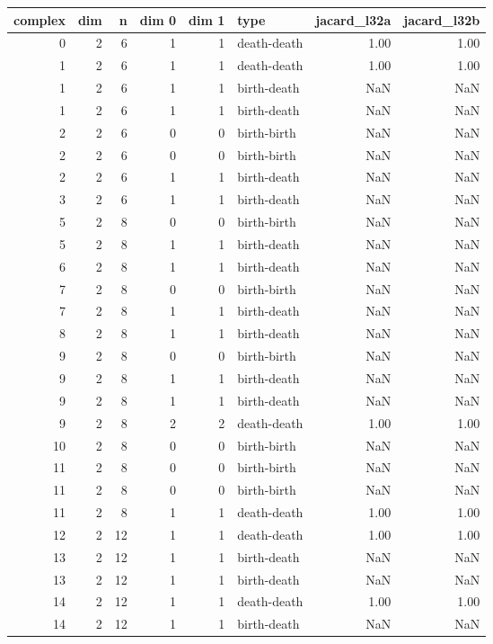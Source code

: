 \documentclass{article}
\begin{document}
\begin{center}
\begin{tabular}{rrrrrlrr}
\toprule
complex & dim & n & dim 0 & dim 1 & type & jacard\_l32a & jacard\_l32b \\
\midrule
0 & 2 & 6 & 1 & 1 & death-death & 1.00 & 1.00 \\
1 & 2 & 6 & 1 & 1 & death-death & 1.00 & 1.00 \\
1 & 2 & 6 & 1 & 1 & birth-death & NaN & NaN \\
1 & 2 & 6 & 1 & 1 & birth-death & NaN & NaN \\
2 & 2 & 6 & 0 & 0 & birth-birth & NaN & NaN \\
2 & 2 & 6 & 0 & 0 & birth-birth & NaN & NaN \\
2 & 2 & 6 & 1 & 1 & birth-death & NaN & NaN \\
3 & 2 & 6 & 1 & 1 & birth-death & NaN & NaN \\
5 & 2 & 8 & 0 & 0 & birth-birth & NaN & NaN \\
5 & 2 & 8 & 1 & 1 & birth-death & NaN & NaN \\
6 & 2 & 8 & 1 & 1 & birth-death & NaN & NaN \\
7 & 2 & 8 & 0 & 0 & birth-birth & NaN & NaN \\
7 & 2 & 8 & 1 & 1 & birth-death & NaN & NaN \\
8 & 2 & 8 & 1 & 1 & birth-death & NaN & NaN \\
9 & 2 & 8 & 0 & 0 & birth-birth & NaN & NaN \\
9 & 2 & 8 & 1 & 1 & birth-death & NaN & NaN \\
9 & 2 & 8 & 1 & 1 & birth-death & NaN & NaN \\
9 & 2 & 8 & 2 & 2 & death-death & 1.00 & 1.00 \\
10 & 2 & 8 & 0 & 0 & birth-birth & NaN & NaN \\
11 & 2 & 8 & 0 & 0 & birth-birth & NaN & NaN \\
11 & 2 & 8 & 0 & 0 & birth-birth & NaN & NaN \\
11 & 2 & 8 & 1 & 1 & death-death & 1.00 & 1.00 \\
12 & 2 & 12 & 1 & 1 & death-death & 1.00 & 1.00 \\
13 & 2 & 12 & 1 & 1 & birth-death & NaN & NaN \\
13 & 2 & 12 & 1 & 1 & birth-death & NaN & NaN \\
14 & 2 & 12 & 1 & 1 & death-death & 1.00 & 1.00 \\
14 & 2 & 12 & 1 & 1 & birth-death & NaN & NaN \\

\end{tabular}
\end{center}
\end{document}
